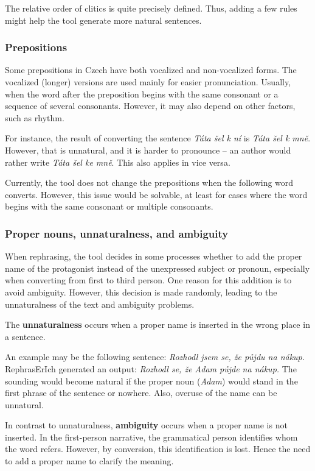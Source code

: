 The relative order of clitics is quite precisely defined. Thus, adding a few rules might help the tool generate more natural sentences.


\subsubsection{Prepositions}

Some prepositions in Czech have both vocalized and non-vocalized forms. The vocalized (longer) versions are used mainly for easier pronunciation. Usually, when the word after the preposition begins with the same consonant or a sequence of several consonants. However, it may also depend on other factors, such as rhythm. \cite{vlasin-slovnik}

For instance, the result of converting the sentence \emph{Táta šel k ní} is \emph{Táta šel k mně}. However, that is unnatural, and it is harder to pronounce -- an author would rather write \emph{Táta šel ke mně}. This also applies in vice versa.

Currently, the tool does not change the prepositions when the following word converts. However, this issue would be solvable, at least for cases where the word begins with the same consonant or multiple consonants.


\subsubsection{Proper nouns, unnaturalness, and ambiguity}

When rephrasing, the tool decides in some processes whether to add the proper name of the protagonist instead of the unexpressed subject or pronoun, especially when converting from first to third person. One reason for this addition is to avoid ambiguity. However, this decision is made randomly, leading to the unnaturalness of the text and ambiguity problems.

The \textbf{unnaturalness} occurs when a proper name is inserted in the wrong place in a sentence.

An example may be the following sentence: \emph{Rozhodl jsem se, že půjdu na nákup.} RephrasErIch generated an output: \emph{Rozhodl se, že Adam půjde na nákup.} The sounding would become natural if the proper noun (\emph{Adam}) would stand in the first phrase of the sentence or nowhere. Also, overuse of the name can be unnatural.

In contrast to unnaturalness, \textbf{ambiguity} occurs when a proper name is not inserted. In the first-person narrative, the grammatical person identifies whom the word refers. However, by conversion, this identification is lost. Hence the need to add a proper name to clarify the meaning.

